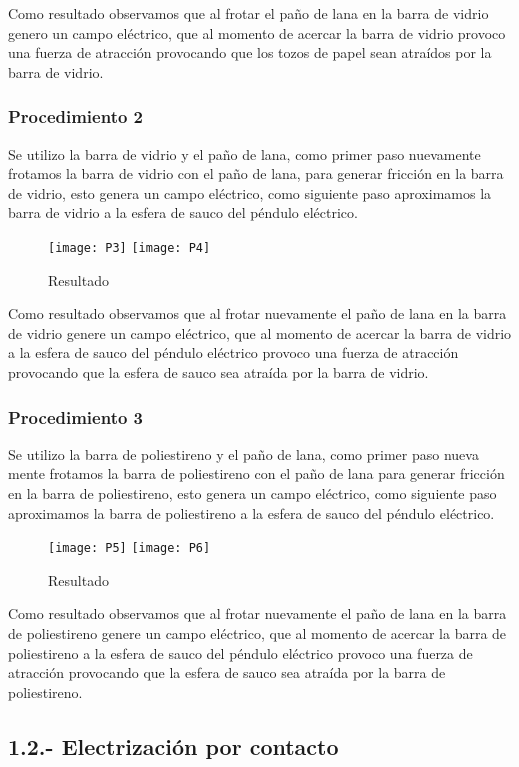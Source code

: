 \documentclass[14pt]{article}
\begin{document}
\begin{multicols}{2}
Como resultado observamos que al frotar el paño de lana en la barra de vidrio genero un campo eléctrico, que al momento de acercar la barra de vidrio provoco una fuerza de atracción provocando que los tozos de papel sean atraídos por la barra de vidrio.

\subsubsection*{Procedimiento 2}

Se utilizo la barra de vidrio y el paño de lana, como primer paso nuevamente frotamos la barra de vidrio con el paño de lana, para generar fricción en la barra de vidrio, esto genera un campo eléctrico, como siguiente paso aproximamos la barra de vidrio a la esfera de sauco del péndulo eléctrico.

\begin{figure}[h]
\centering
\texttt{[image: P3]}
\texttt{[image: P4]}
\caption{Resultado}
\end{figure}

Como resultado observamos que al frotar nuevamente el paño de lana en la barra de vidrio genere un campo eléctrico, que al momento de acercar la barra de vidrio a la esfera de sauco del péndulo eléctrico provoco una fuerza de atracción provocando que la esfera de sauco sea atraída por la barra de vidrio.
\subsubsection*{Procedimiento 3}
Se utilizo la barra de poliestireno y el paño de lana, como primer paso nueva mente frotamos la barra de poliestireno con el paño de lana para generar fricción en la barra de poliestireno, esto genera un campo eléctrico, como siguiente paso aproximamos la barra de poliestireno a la esfera de sauco del péndulo eléctrico.

\begin{figure}[h]
\centering
\texttt{[image: P5]}
\texttt{[image: P6]}
\caption{Resultado}
\end{figure}

Como resultado observamos que al frotar nuevamente el paño de lana en la barra de poliestireno genere un campo eléctrico, que al momento de acercar la barra de poliestireno a la esfera de sauco del péndulo eléctrico provoco una fuerza de atracción provocando que la esfera de sauco sea atraída por la barra de poliestireno.

\subsection*{1.2.- Electrización por contacto}

\end{multicols}
\end{document}
